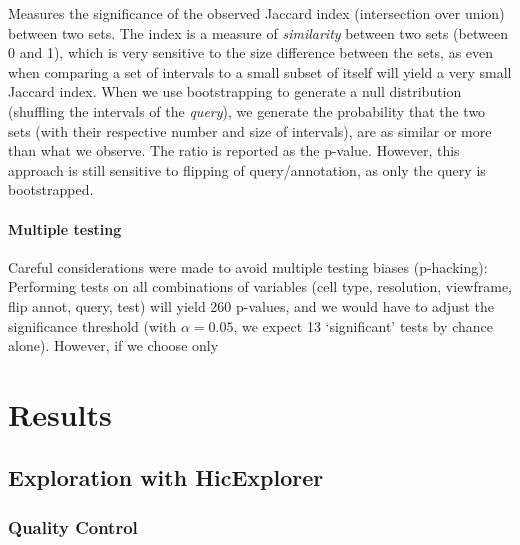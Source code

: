 \documentclass[
  11pt,
  a4paper,
]{scrbook}
\let\oldemph\emph
\renewcommand\emph[1]{\oldemph{\color{gray}#1}}
\begin{document}
Measures the significance of the observed Jaccard index (intersection
over union) between two sets. The index is a measure of
\emph{similarity} between two sets (between 0 and 1), which is very
sensitive to the size difference between the sets, as even when
comparing a set of intervals to a small subset of itself will yield a
very small Jaccard index. When we use bootstrapping to generate a null
distribution (shuffling the intervals of the \emph{query}), we generate
the probability that the two sets (with their respective number and size
of intervals), are as similar or more than what we observe. The ratio is
reported as the p-value. However, this approach is still sensitive to
flipping of query/annotation, as only the query is bootstrapped.

\subsubsection{Multiple testing}\label{multiple-testing}

Careful considerations were made to avoid multiple testing biases
(p-hacking): Performing tests on all combinations of variables (cell
type, resolution, viewframe, flip annot, query, test) will yield 260
p-values, and we would have to adjust the significance threshold (with
\(\alpha = 0.05\), we expect 13 `significant' tests by chance alone).
However, if we choose only

\chapter{Results}\label{results}

\section{Exploration with
HicExplorer}\label{exploration-with-hicexplorer}

\subsection{Quality Control}\label{quality-control}
\end{document}
